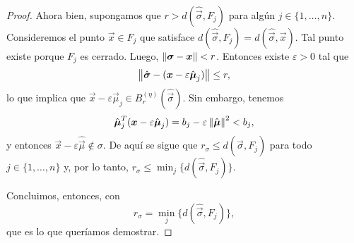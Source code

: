 \begin{proof}
	Ahora bien, supongamos que $r > d(\hat{\vec{\sigma}}, F_j)$ para algún $j \in \lbrace 1, \ldots,
	n \rbrace$. Consideremos el punto $\vec{x} \in F_j$ que satisface $d(\hat{\vec{\sigma}}, F_j) =
	d(\hat{\vec{\sigma}}, \vec{x})$. Tal punto existe porque $F_j$ es cerrado. Luego,
	$\left\lVert \boldsymbol{\sigma} - \boldsymbol{x} \right\rVert < r$. Entonces existe $\varepsilon > 0$ tal que
	\begin{equation*}
		\left\lVert \hat{\boldsymbol{\sigma}} - (\boldsymbol{x} - \varepsilon\hat{\boldsymbol{\mu}}_j) \right\rVert \leq r,
	\end{equation*}
	lo que implica que $\vec{x} - \varepsilon\hat{\vec{\mu}}_j \in
	B_r^{(\eta)}(\hat{\vec{\sigma}})$. Sin embargo, tenemos
	\begin{equation*}
		\hat{\boldsymbol{\mu}}_j^T(\boldsymbol{x} - \varepsilon\hat{\boldsymbol{\mu}}_j)
		= b_j - \varepsilon\left\lVert \hat{\boldsymbol{\mu}} \right\rVert^2 < b_j,
	\end{equation*}
	y entonces $\vec{x} - \varepsilon\hat{\vec{\mu}} \not\in \sigma$. De aquí se sigue que $r_\sigma
	\leq d(\hat{\vec{\sigma}}, F_j)$ para todo $j \in \lbrace 1, \ldots, n \rbrace$ y, por lo tanto,
	$r_\sigma \leq \min_{j} \lbrace d(\hat{\vec{\sigma}}, F_j) \rbrace$.

	Concluimos, entonces, con
	\begin{equation*}
		r_\sigma = \min_{j} \lbrace d(\hat{\vec{\sigma}}, F_j) \rbrace,
	\end{equation*}
	que es lo que queríamos demostrar.
\end{proof}

